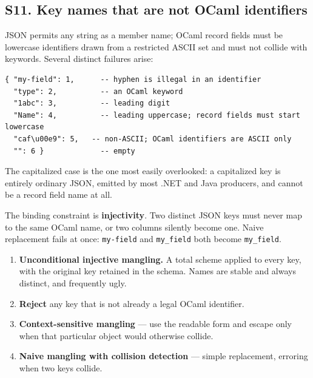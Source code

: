 \subsection*{S11. Key names that are not OCaml identifiers}

JSON permits any string as a member name; OCaml record fields must be
lowercase identifiers drawn from a restricted ASCII set and must not collide
with keywords. Several distinct failures arise:

\begin{lstlisting}[style=json]
{ "my-field": 1,      -- hyphen is illegal in an identifier
  "type": 2,          -- an OCaml keyword
  "1abc": 3,          -- leading digit
  "Name": 4,          -- leading uppercase; record fields must start lowercase
  "caf\u00e9": 5,   -- non-ASCII; OCaml identifiers are ASCII only
  "": 6 }             -- empty
\end{lstlisting}

The capitalized case is the one most easily overlooked: a capitalized key is
entirely ordinary JSON, emitted by most .NET and Java producers, and cannot be
a record field name at all.

The binding constraint is \textbf{injectivity}. Two distinct JSON keys must
never map to the same OCaml name, or two columns silently become one. Naive
replacement fails at once: \texttt{my-field} and \texttt{my\_field} both
become \texttt{my\_field}.

\options
\begin{enumerate}[label=\textbf{(\alph*)}]
  \item \textbf{Unconditional injective mangling.} A total scheme applied to
        every key, with the original key retained in the schema. Names are
        stable and always distinct, and frequently ugly. \selected
  \item \textbf{Reject} any key that is not already a legal OCaml identifier.
  \item \textbf{Context-sensitive mangling} --- use the readable form and
        escape only when that particular object would otherwise collide.
  \item \textbf{Naive mangling with collision detection} --- simple
        replacement, erroring when two keys collide.
\end{enumerate}


